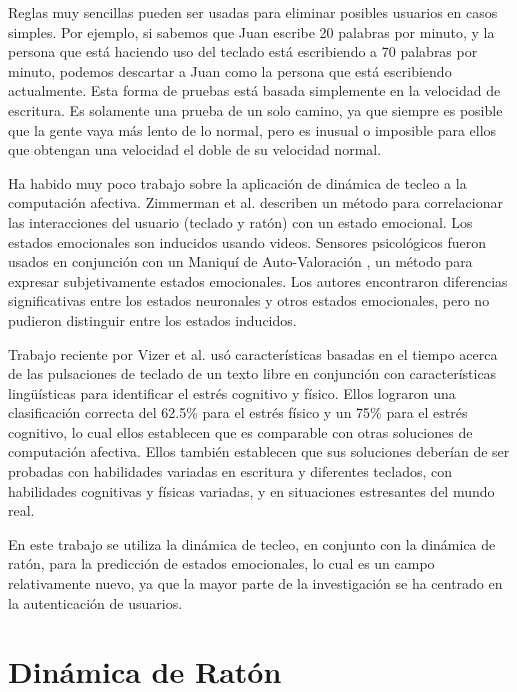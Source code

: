 Reglas muy sencillas pueden ser usadas para eliminar posibles usuarios
en casos simples. Por ejemplo, si sabemos que Juan escribe 20 palabras
por minuto, y la persona que está haciendo uso del teclado está
escribiendo a 70 palabras por minuto, podemos descartar a Juan como la
persona que está escribiendo actualmente. Esta forma de pruebas está
basada simplemente en la velocidad de escritura. Es solamente una
prueba de un solo camino, ya que siempre es posible que la gente vaya
más lento de lo normal, pero es inusual o imposible para ellos que
obtengan una velocidad el doble de su velocidad normal.

Ha habido muy poco trabajo sobre la aplicación de dinámica de tecleo a
la computación afectiva. Zimmerman et
al. \cite{zimmermann2003affective} describen un método para
correlacionar las interacciones del usuario (teclado y ratón) con un
estado emocional. Los estados emocionales son inducidos usando
videos. Sensores psicológicos fueron usados en conjunción con un
Maniquí de Auto-Valoración \cite{lang1980behavioral}, un método para
expresar subjetivamente estados emocionales. Los autores encontraron
diferencias significativas entre los estados neuronales y otros
estados emocionales, pero no pudieron distinguir entre los estados
inducidos.

Trabajo reciente por Vizer et al. \cite{vizer2009automated} usó
características basadas en el tiempo acerca de las pulsaciones de
teclado de un texto libre en conjunción con características
lingüísticas para identificar el estrés cognitivo y físico. Ellos
lograron una clasificación correcta del 62.5\% para el estrés físico y
un 75\% para el estrés cognitivo, lo cual ellos establecen que es
comparable con otras soluciones de computación afectiva. Ellos también
establecen que sus soluciones deberían de ser probadas con habilidades
variadas en escritura y diferentes teclados, con habilidades
cognitivas y físicas variadas, y en situaciones estresantes del mundo real.

En este trabajo se utiliza la dinámica de tecleo, en conjunto con la
dinámica de ratón, para la predicción de estados emocionales, lo cual
es un campo relativamente nuevo, ya que la mayor parte de la
investigación se ha centrado en la autenticación de usuarios.

\section{Dinámica de Ratón}
\label{dinamica-de-raton}


